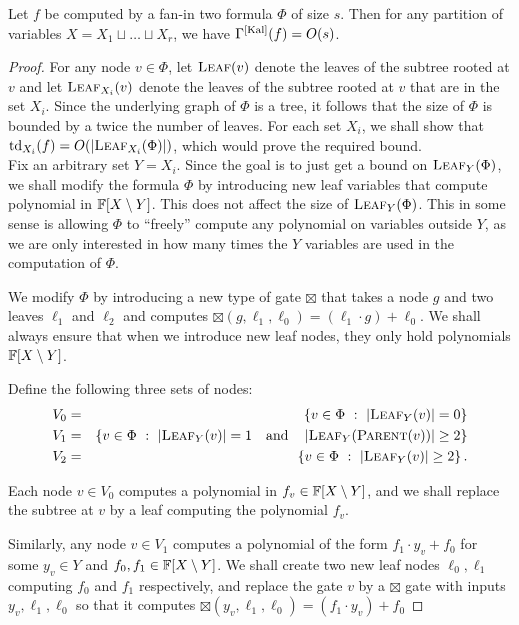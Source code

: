 \begin{lemma}\label{lem:kal-upperbound}
  Let $f$ be computed by a fan-in two formula $\Phi$ of size $s$.
Then for any partition of variables $X = X_1\sqcup \dots \sqcup X_r$, we have $\Gamma^{\mathrm{[Kal]}}(f) = O(s)$.
\end{lemma}
\begin{proof}
  For any node $v\in \Phi$, let $\textsc{Leaf}(v)$ denote the leaves of the subtree rooted at $v$ and let $\textsc{Leaf}_{X_i}(v)$ denote the leaves of the subtree rooted at $v$ that are in the set $X_i$.
Since the underlying graph of $\Phi$ is a tree, it follows that the size of $\Phi$ is bounded by a twice the number of leaves.
For each set $X_i$, we shall show that $\mathrm{td}_{X_i}(f) = O(\left|\textsc{Leaf}_{X_i}(\Phi)\right|)$, which would prove the required bound.
\\

Fix an arbitrary set $Y = X_i$.
Since the goal is to just get a bound on $\textsc{Leaf}_{Y}(\Phi)$, we shall modify the formula $\Phi$ by introducing new leaf variables that compute polynomial in $\mathbb{F}[X \setminus Y]$.
This does not affect the size of $\textsc{Leaf}_{Y}(\Phi)$.
This in some sense is allowing $\Phi$ to ``freely'' compute any polynomial on variables outside $Y$, as we are only interested in how many times the $Y$ variables are used in the computation of $\Phi$.

We modify $\Phi$ by introducing a new type of gate $\boxtimes$ that takes a node $g$ and two leaves $\ell_1$ and $\ell_2$ and computes $\boxtimes(g,\ell_1,\ell_0) = (\ell_1 \cdot g) + \ell_0$.
We shall always ensure that when we introduce new leaf nodes, they only hold polynomials $\mathbb{F}[X \setminus Y]$.

Define the following three sets of nodes:
  \begin{eqnarray*}
    V_0 & = & \left\{{v\in \Phi}\ : \ {\left|\textsc{Leaf}_{Y}(v)\right| = 0}\right\}\\
    V_1 & = & \left\{{v\in \Phi}\ : \ {\left|\textsc{Leaf}_{Y}(v)\right| = 1 \quad\text{and}\quad \left|\textsc{Leaf}_{Y}(\textsc{Parent}(v))\right| \geq 2}\right\}\\
    V_2 & = & \left\{{v\in \Phi}\ : \ {\left|\textsc{Leaf}_{Y}(v)\right| \geq 2}\right\}.
  \end{eqnarray*}


  Each node $v\in V_0$ computes a polynomial in $f_v \in \mathbb{F}[X\setminus Y]$, and we shall replace the subtree at $v$ by a leaf computing the polynomial $f_v$.

  Similarly, any node $v\in V_1$ computes a polynomial of the form $f_1 \cdot y_v + f_0$ for some $y_v\in Y$
  and $f_0,f_1 \in \mathbb{F}[X\setminus Y]$. 
  We shall create two new leaf nodes $\ell_0,\ell_1$ computing $f_0$ and $f_1$ respectively, and replace the gate $v$ by a $\boxtimes$ gate with inputs $y_v,\ell_1,\ell_0$ so that it computes $\boxtimes(y_v,\ell_1,\ell_0) = (f_1 \cdot y_v) + f_0$


\end{proof}
